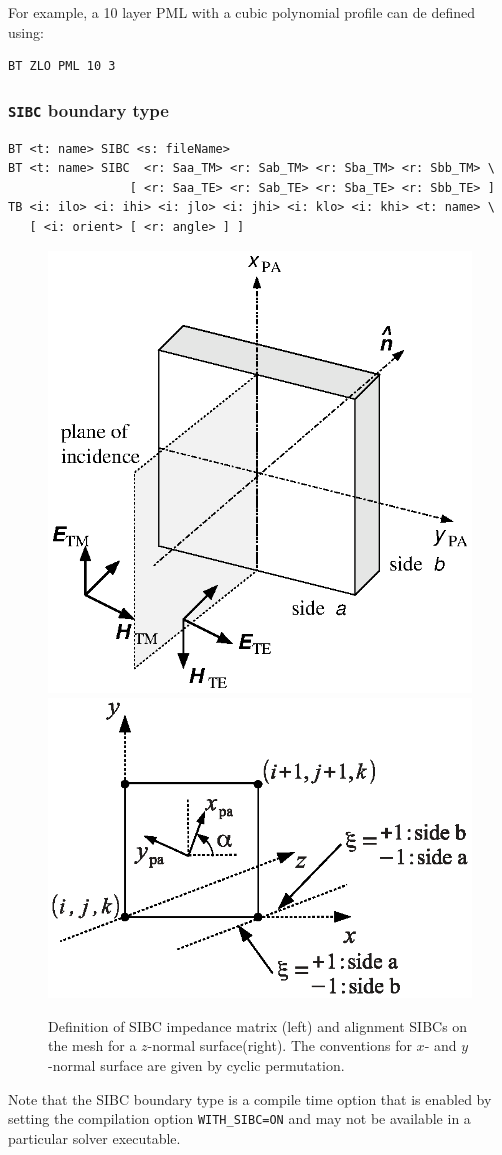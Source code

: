 \documentclass[onecolumn,a4paper]{article}
\numberwithin{equation}{section}
\begin{document}
For example, a 10 layer PML with a cubic polynomial profile can de defined using:
\begin{verbatim}
BT ZLO PML 10 3     
\end{verbatim}

\subsubsection{\texttt{SIBC} boundary type}

\begin{verbatim}
BT <t: name> SIBC <s: fileName>
BT <t: name> SIBC  <r: Saa_TM> <r: Sab_TM> <r: Sba_TM> <r: Sbb_TM> \
                 [ <r: Saa_TE> <r: Sab_TE> <r: Sba_TE> <r: Sbb_TE> ]
TB <i: ilo> <i: ihi> <i: jlo> <i: jhi> <i: klo> <i: khi> <t: name> \
   [ <i: orient> [ <r: angle> ] ]
\end{verbatim}

\begin{figure}[ht]
  \begin{center}
    \includegraphics[width=0.40\linewidth]{figures/axesdef}
    \includegraphics[width=0.49\linewidth]{figures/sibc}
  \end{center}
  \caption{\label{fg:sibc}Definition of SIBC impedance matrix (left) and alignment SIBCs on the mesh for a
  $z$-normal surface(right). The conventions for $x$- and $y$-normal surface are given by cyclic permutation.}
\end{figure}

Note that the SIBC boundary type is a compile time option that is enabled by setting the 
compilation option \texttt{WITH\_SIBC=ON} and may not be available in a particular solver executable.
\end{document}
